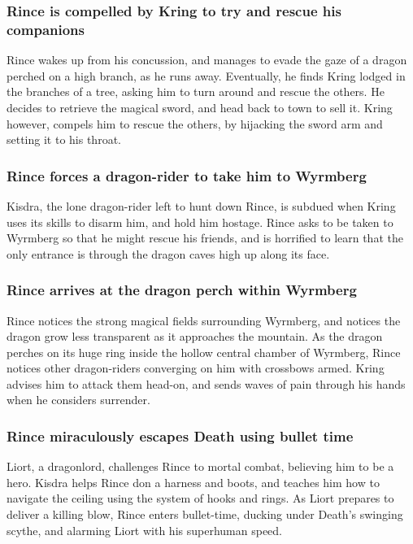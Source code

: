 \subsubsection{\Gls{Rince} is compelled by \Gls{Kring} to try and rescue his companions}
\Gls{Rince} wakes up from his concussion, and manages to evade the gaze of a dragon perched on a
high branch, as he runs away. Eventually, he finds \Gls{Kring} lodged in the branches of a tree,
asking him to turn around and rescue the others. He decides to retrieve the magical sword, and head
back to town to sell it. \Gls{Kring} however, compels him to rescue the others, by hijacking the
sword arm and setting it to his throat.

\subsubsection{\Gls{Rince} forces a dragon-rider to take him to Wyrmberg}
\Gls{Kisdra}, the lone dragon-rider left to hunt down \Gls{Rince}, is subdued when \Gls{Kring} uses
its skills to disarm him, and hold him hostage. \Gls{Rince} asks to be taken to Wyrmberg so that he
might rescue his friends, and is horrified to learn that the only entrance is through the dragon
caves high up along its face.

\subsubsection{\Gls{Rince} arrives at the dragon perch within Wyrmberg}
\Gls{Rince} notices the strong magical fields surrounding Wyrmberg, and notices the dragon grow
less transparent as it approaches the mountain. As the dragon perches on its huge ring inside the
hollow central chamber of Wyrmberg, \Gls{Rince} notices other dragon-riders converging on him with
crossbows armed. \Gls{Kring} advises him to attack them head-on, and sends waves of pain through
his hands when he considers surrender.

\subsubsection{\Gls{Rince} miraculously escapes \Gls{Death} using bullet time}
\Gls{Liort}, a dragonlord, challenges \Gls{Rince} to mortal combat, believing him to be a hero.
\Gls{Kisdra} helps \Gls{Rince} don a harness and boots, and teaches him how to navigate the ceiling
using the system of hooks and rings. As \Gls{Liort} prepares to deliver a killing blow, \Gls{Rince}
enters bullet-time, ducking under \Gls{Death}'s swinging scythe, and alarming \Gls{Liort} with his
superhuman speed.

